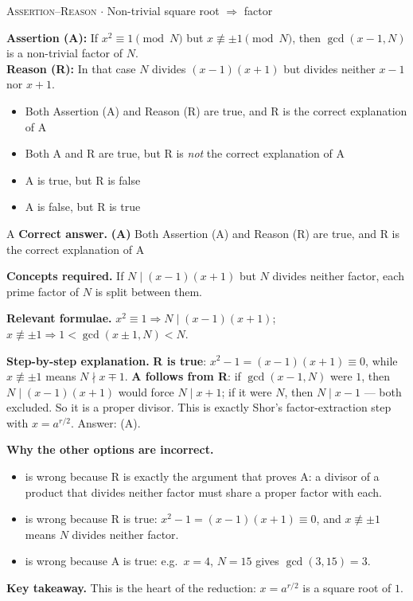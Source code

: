 \documentclass[11pt,a4paper]{article}
\newcommand{\optlabel}[1]{\textbf{(#1)}}
\newcommand{\correctlabel}[1]{\textcolor{okgreen}{\textbf{(#1)}\,\ding{51}}}
\newenvironment{qitem}[1]{\begin{list}{}{\setlength{\leftmargin}{3.3em}\setlength{\labelwidth}{3.1em}%
  \setlength{\labelsep}{0.2em}\setlength{\topsep}{3pt}\setlength{\parsep}{3pt}}\item[\textbf{Q.#1}\hfill]}{\end{list}}
\newcommand{\qsep}{\par\vspace{2pt}{\color{black!15}\hrule}\vspace{4pt}}
\newcommand{\qmeta}[2]{{\footnotesize\color{black!60}\textsc{#1} \;$\cdot$\; #2}\par}
\begin{document}
\begin{qitem}{17}
\qmeta{Assertion--Reason}{Non-trivial square root $\Rightarrow$ factor}
\textbf{Assertion (A):} If $x^2 \equiv 1 \pmod N$ but $x \not\equiv \pm1 \pmod N$, then $\gcd(x - 1, N)$ is a non-trivial factor of $N$.\\[1mm]
\textbf{Reason (R):} In that case $N$ divides $(x - 1)(x + 1)$ but divides neither $x - 1$ nor $x + 1$.
\begin{itemize}[leftmargin=2.6em, labelsep=0.4em, itemsep=2pt, topsep=3pt]
\item[\correctlabel{A}] Both Assertion (A) and Reason (R) are true, and R is the correct explanation of A
\item[\optlabel{B}] Both A and R are true, but R is \emph{not} the correct explanation of A
\item[\optlabel{C}] A is true, but R is false
\item[\optlabel{D}] A is false, but R is true
\end{itemize}
\end{qitem}
\begin{solbox}{A}
\textbf{\color{brand}Correct answer.} \textcolor{okgreen}{\textbf{(A)}} Both Assertion (A) and Reason (R) are true, and R is the correct explanation of A

\textbf{\color{brand}Concepts required.} If $N \mid (x - 1)(x + 1)$ but $N$ divides neither factor, each prime factor of $N$ is split between them.

\textbf{\color{brand}Relevant formulae.} $x^2 \equiv 1 \Rightarrow N \mid (x - 1)(x + 1)$; $x \not\equiv \pm1 \Rightarrow 1 < \gcd(x \pm 1, N) < N$.

\textbf{\color{brand}Step-by-step explanation.} \textbf{R is true}: $x^2 - 1 = (x-1)(x+1) \equiv 0$, while $x \not\equiv \pm1$ means $N \nmid x \mp 1$. \textbf{A follows from R}: if $\gcd(x - 1, N)$ were
$1$, then $N \mid (x-1)(x+1)$ would force $N \mid x + 1$; if it were $N$, then $N \mid x - 1$ --- both excluded. So it is a proper divisor. This is exactly
Shor's factor-extraction step with $x = a^{r/2}$. Answer: (A).

\textbf{\color{brand}Why the other options are incorrect.}
\begin{itemize}[leftmargin=2.4em, itemsep=1pt, topsep=2pt]
\item[\textbf{(B)}] is wrong because R is exactly the argument that proves A: a divisor of a product that divides neither factor must share a proper factor with each.
\item[\textbf{(C)}] is wrong because R is true: $x^2 - 1 = (x - 1)(x + 1) \equiv 0$, and $x \not\equiv \pm1$ means $N$ divides neither factor.
\item[\textbf{(D)}] is wrong because A is true: e.g.\ $x = 4$, $N = 15$ gives $\gcd(3, 15) = 3$.
\end{itemize}
\textbf{\color{brand}Key takeaway.} This is the heart of the reduction: $x = a^{r/2}$ is a square root of $1$.
\end{solbox}
\qsep
\end{document}
